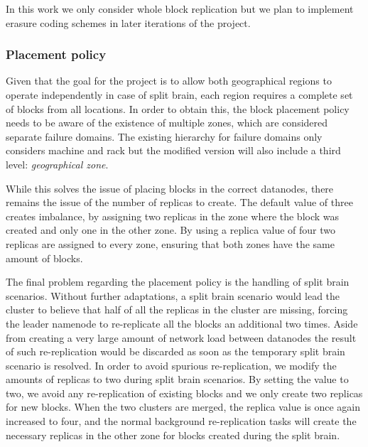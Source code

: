 In this work we only consider whole block replication but we plan to implement erasure coding schemes in later iterations of the project.

\subsubsection{Placement policy}
Given that the goal for the project is to allow both geographical regions to operate independently in case of split brain, each region requires a complete set of blocks from all locations.
In order to obtain this, the block placement policy needs to be aware of the existence of multiple zones, which are considered separate failure domains.
The existing hierarchy for failure domains only considers machine and rack but the modified version will also include a third level: \emph{geographical zone}.

While this solves the issue of placing blocks in the correct datanodes, there remains the issue of the number of replicas to create.
The default value of three creates imbalance, by assigning two replicas in the zone where the block was created and only one in the other zone.
By using a replica value of four two replicas are assigned to every zone, ensuring that both zones have the same amount of blocks.

The final problem regarding the placement policy is the handling of split brain scenarios.
Without further adaptations, a split brain scenario would lead the cluster to believe that half of all the replicas in the cluster are missing, forcing the leader namenode to re-replicate all the blocks an additional two times.
Aside from creating a very large amount of network load between datanodes the result of such re-replication would be discarded as soon as the temporary split brain scenario is resolved.
In order to avoid spurious re-replication, we modify the amounts of replicas to two during split brain scenarios.
By setting the value to two, we avoid any re-replication of existing blocks and we only create two replicas for new blocks.
When the two clusters are merged, the replica value is once again increased to four, and the normal background re-replication tasks will create the necessary replicas in the other zone for blocks created during the split brain.